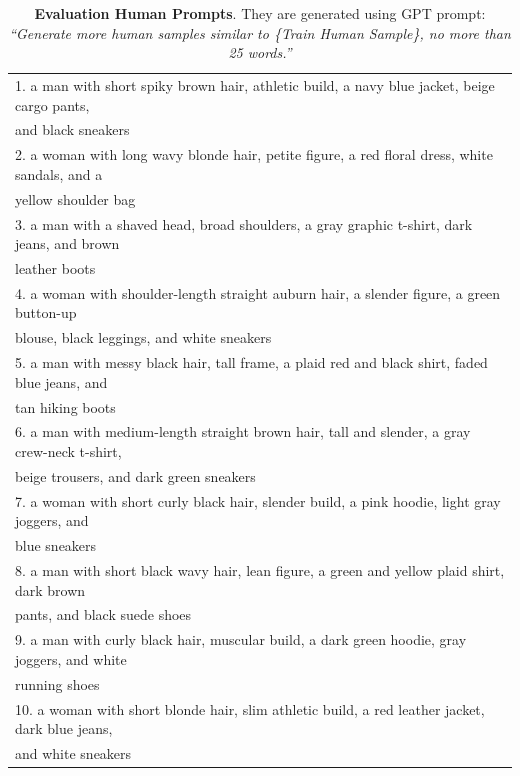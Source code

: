 \begin{table}[!ht]

\caption{\textbf{Evaluation Human Prompts}. They are generated using GPT prompt: \textit{``Generate more human samples similar to \{Train Human Sample\}, no more than 25 words.''}}
\label{tab:human_prompts}

\begin{threeparttable}
\resizebox{.99\textwidth}{!} 
{
\begin{tabular}{l}
\toprule

1. a man with short spiky brown hair, athletic build, a navy blue jacket, beige cargo pants, \\ \quad and black sneakers  \\
2. a woman with long wavy blonde hair, petite figure, a red floral dress, white sandals, and a \\ \quad yellow shoulder bag \\
3. a man with a shaved head, broad shoulders, a gray graphic t-shirt, dark jeans, and brown \\ \quad leather boots \\
4. a woman with shoulder-length straight auburn hair, a slender figure, a green button-up \\ \quad 
 blouse, black leggings, and white sneakers \\
5. a man with messy black hair, tall frame, a plaid red and black shirt, faded blue jeans, and \\ \quad tan hiking boots \\
6. a man with medium-length straight brown hair, tall and slender, a gray crew-neck t-shirt,\\ \quad beige trousers, and dark green sneakers \\
7. a woman with short curly black hair, slender build, a pink hoodie, light gray joggers, and \\ \quad blue sneakers \\
8. a man with short black wavy hair, lean figure, a green and yellow plaid shirt, dark brown \\ \quad pants, and black suede shoes \\
9. a man with curly black hair, muscular build, a dark green hoodie, gray joggers, and white \\ \quad running shoes \\
10. a woman with short blonde hair, slim athletic build, a red leather jacket, dark blue jeans, \\ \quad and white sneakers \\

\end{tabular}}
\end{threeparttable}
\end{table}
